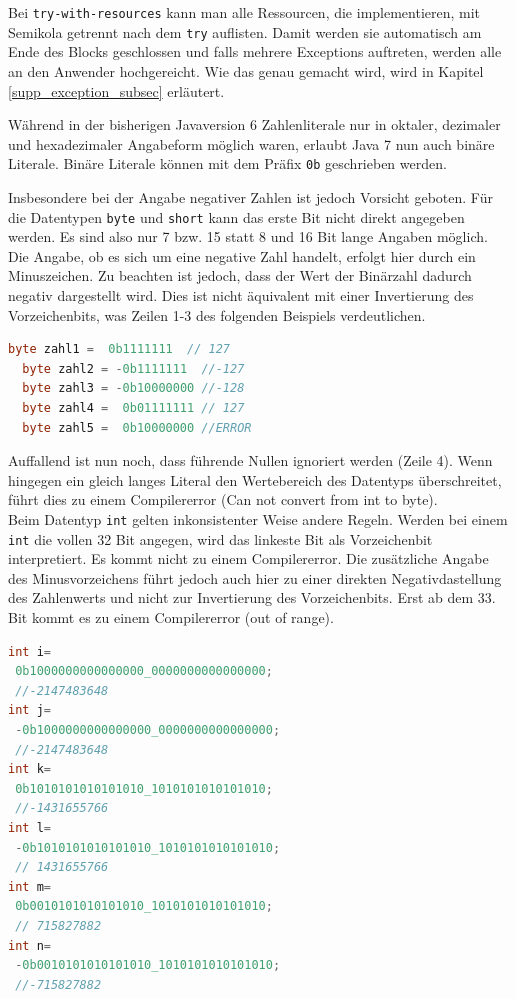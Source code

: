 \documentclass[times, 10pt,twocolumn]{article}
\begin{document}
Bei \texttt{try-with-resources} kann man alle Ressourcen, die  implementieren, mit Semikola getrennt 
nach dem \texttt{try} auflisten. Damit werden sie automatisch am Ende des Blocks geschlossen und falls mehrere Exceptions auftreten,
werden alle an den Anwender hochgereicht. Wie das genau gemacht wird, wird in Kapitel \ref{supp_exception_subsec} erläutert. 


Während in der bisherigen Javaversion 6 Zahlenliterale nur in oktaler, dezimaler und hexadezimaler Angabeform möglich waren, erlaubt Java 7 nun auch binäre Literale. Binäre Literale können mit dem Präfix \texttt{0b} geschrieben werden.

Insbesondere bei der Angabe negativer Zahlen ist jedoch Vorsicht geboten. Für die Datentypen \texttt{byte} und \texttt{short} kann das erste Bit nicht direkt angegeben werden. Es sind also nur 7 bzw. 15 statt 8 und 16 Bit lange Angaben möglich. Die Angabe, ob es sich um eine negative Zahl handelt, erfolgt hier durch ein Minuszeichen. Zu beachten ist jedoch, dass der Wert der Binärzahl dadurch negativ dargestellt wird. Dies ist nicht äquivalent mit einer Invertierung des Vorzeichenbits, was Zeilen 1-3 des folgenden Beispiels verdeutlichen.\cite{sbJ7literals}
\begin{lstlisting}[language=java,breaklines=true]
  byte zahl1 =  0b1111111  // 127
  byte zahl2 = -0b1111111  //-127
  byte zahl3 = -0b10000000 //-128
  byte zahl4 =  0b01111111 // 127
  byte zahl5 =  0b10000000 //ERROR
\end{lstlisting}
Auffallend ist nun noch, dass führende Nullen ignoriert werden (Zeile 4). Wenn hingegen ein gleich langes Literal den Wertebereich des Datentyps überschreitet, führt dies zu einem Compilererror (Can not convert from int to byte)\cite{sbJ7literals}.\\

Beim Datentyp \texttt{int} gelten inkonsistenter Weise andere Regeln. Werden bei einem \texttt{int} die vollen 32 Bit angegen, wird das linkeste Bit als Vorzeichenbit interpretiert. Es kommt nicht zu einem Compilererror. Die zusätzliche Angabe des Minusvorzeichens führt jedoch auch hier zu einer direkten Negativdastellung des Zahlenwerts und nicht zur Invertierung des Vorzeichenbits. Erst ab dem 33. Bit kommt es zu einem Compilererror (out of range).
\begin{lstlisting}[language=java,breaklines=true]
int i=
 0b1000000000000000_0000000000000000;
 //-2147483648
int j=
 -0b1000000000000000_0000000000000000;
 //-2147483648
int k=
 0b1010101010101010_1010101010101010;
 //-1431655766
int l=
 -0b1010101010101010_1010101010101010;
 // 1431655766
int m=
 0b0010101010101010_1010101010101010;
 // 715827882
int n=
 -0b0010101010101010_1010101010101010;
 //-715827882
\end{lstlisting}
\end{document}
